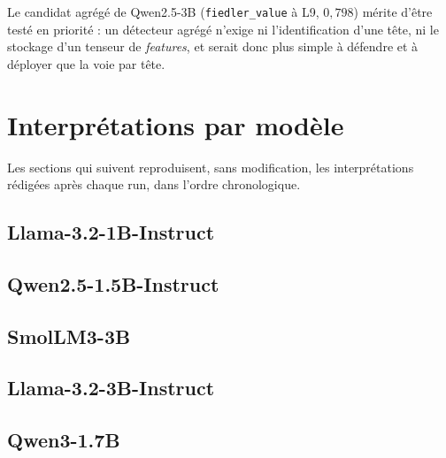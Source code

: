 \documentclass[11pt,a4paper]{article}
\begin{document}
Le candidat agrégé de Qwen2.5-3B (\texttt{fiedler\_value} à L9, $0{,}798$)
mérite d'être testé en priorité : un détecteur agrégé n'exige ni l'identification
d'une tête, ni le stockage d'un tenseur de \emph{features}, et serait donc plus
simple à défendre et à déployer que la voie par tête.

\newpage
\section{Interprétations par modèle}

Les sections qui suivent reproduisent, sans modification, les interprétations
rédigées après chaque run, dans l'ordre chronologique.

\subsection{Llama-3.2-1B-Instruct}
\label{sec:llama1b}

\subsection{Qwen2.5-1.5B-Instruct}
\label{sec:qwen25-15b}

\subsection{SmolLM3-3B}
\label{sec:smollm3}

\subsection{Llama-3.2-3B-Instruct}
\label{sec:llama3b}

\subsection{Qwen3-1.7B}
\label{sec:qwen3}
\end{document}
